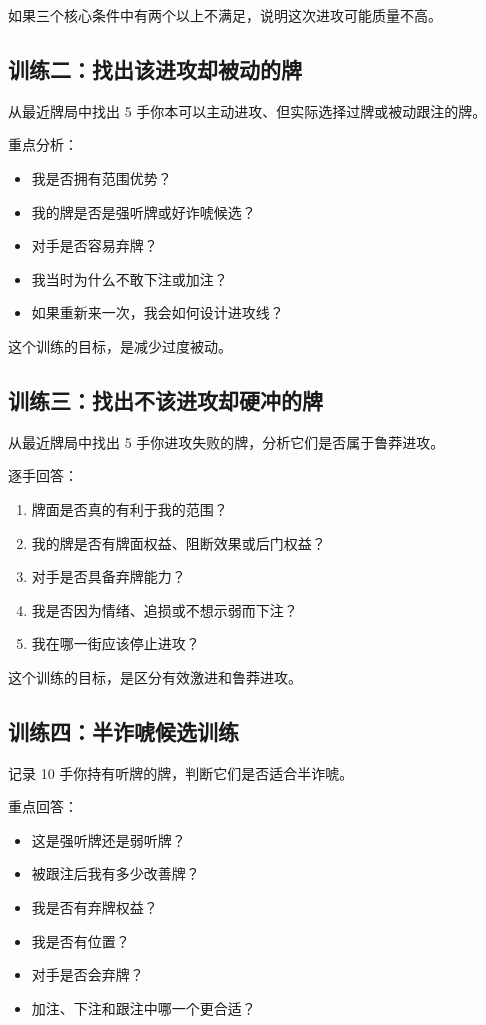 如果三个核心条件中有两个以上不满足，说明这次进攻可能质量不高。

\subsection*{训练二：找出该进攻却被动的牌}

从最近牌局中找出 5 手你本可以主动进攻、但实际选择过牌或被动跟注的牌。

重点分析：

\begin{itemize}
\item 我是否拥有范围优势？
\item 我的牌是否是强听牌或好诈唬候选？
\item 对手是否容易弃牌？
\item 我当时为什么不敢下注或加注？
\item 如果重新来一次，我会如何设计进攻线？
\end{itemize}

这个训练的目标，是减少过度被动。

\subsection*{训练三：找出不该进攻却硬冲的牌}

从最近牌局中找出 5 手你进攻失败的牌，分析它们是否属于鲁莽进攻。

逐手回答：

\begin{enumerate}
\item 牌面是否真的有利于我的范围？
\item 我的牌是否有牌面权益、阻断效果或后门权益？
\item 对手是否具备弃牌能力？
\item 我是否因为情绪、追损或不想示弱而下注？
\item 我在哪一街应该停止进攻？
\end{enumerate}

这个训练的目标，是区分有效激进和鲁莽进攻。

\subsection*{训练四：半诈唬候选训练}

记录 10 手你持有听牌的牌，判断它们是否适合半诈唬。

重点回答：

\begin{itemize}
\item 这是强听牌还是弱听牌？
\item 被跟注后我有多少改善牌？
\item 我是否有弃牌权益？
\item 我是否有位置？
\item 对手是否会弃牌？
\item 加注、下注和跟注中哪一个更合适？
\end{itemize}


